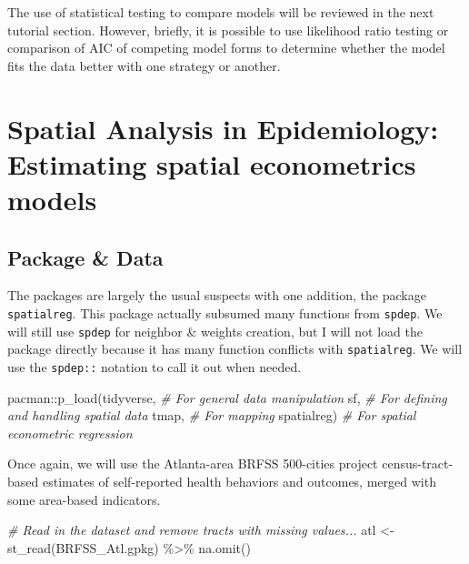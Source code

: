 \documentclass[
]{book}
\newenvironment{Shaded}{\begin{snugshade}}{\end{snugshade}}
\newcommand{\CommentTok}[1]{\textcolor[rgb]{0.56,0.35,0.01}{\textit{#1}}}
\newcommand{\FunctionTok}[1]{\textcolor[rgb]{0.00,0.00,0.00}{#1}}
\newcommand{\NormalTok}[1]{#1}
\newcommand{\OtherTok}[1]{\textcolor[rgb]{0.56,0.35,0.01}{#1}}
\newcommand{\SpecialCharTok}[1]{\textcolor[rgb]{0.00,0.00,0.00}{#1}}
\newcommand{\StringTok}[1]{\textcolor[rgb]{0.31,0.60,0.02}{#1}}
\begin{document}
The use of statistical testing to compare models will be reviewed in the next tutorial section. However, briefly, it is possible to use likelihood ratio testing or comparison of AIC of competing model forms to determine whether the model fits the data better with one strategy or another.

\hypertarget{spatial-analysis-in-epidemiology-estimating-spatial-econometrics-models}{%
\section{Spatial Analysis in Epidemiology: Estimating spatial econometrics models}\label{spatial-analysis-in-epidemiology-estimating-spatial-econometrics-models}}

\hypertarget{package-data}{%
\subsection{Package \& Data}\label{package-data}}

The packages are largely the usual suspects with one addition, the package \texttt{spatialreg}. This package actually subsumed many functions from \texttt{spdep}. We will still use \texttt{spdep} for neighbor \& weights creation, but I will not load the package directly because it has many function conflicts with \texttt{spatialreg}. We will use the \texttt{spdep::} notation to call it out when needed.

\begin{Shaded}
\begin{Highlighting}[]
\NormalTok{pacman}\SpecialCharTok{::}\FunctionTok{p\_load}\NormalTok{(tidyverse,   }\CommentTok{\# For general data manipulation}
\NormalTok{               sf,          }\CommentTok{\# For defining and handling spatial data}
\NormalTok{               tmap,        }\CommentTok{\# For mapping}
\NormalTok{               spatialreg)  }\CommentTok{\# For spatial econometric regression}
\end{Highlighting}
\end{Shaded}

Once again, we will use the Atlanta-area BRFSS 500-cities project census-tract-based estimates of self-reported health behaviors and outcomes, merged with some area-based indicators.

\begin{Shaded}
\begin{Highlighting}[]
\CommentTok{\# Read in the dataset and remove tracts with missing values...}
\NormalTok{atl }\OtherTok{\textless{}{-}} \FunctionTok{st\_read}\NormalTok{(}\StringTok{\textquotesingle{}BRFSS\_Atl.gpkg\textquotesingle{}}\NormalTok{) }\SpecialCharTok{\%\textgreater{}\%}
  \FunctionTok{na.omit}\NormalTok{() }
\end{Highlighting}
\end{Shaded}
\end{document}
